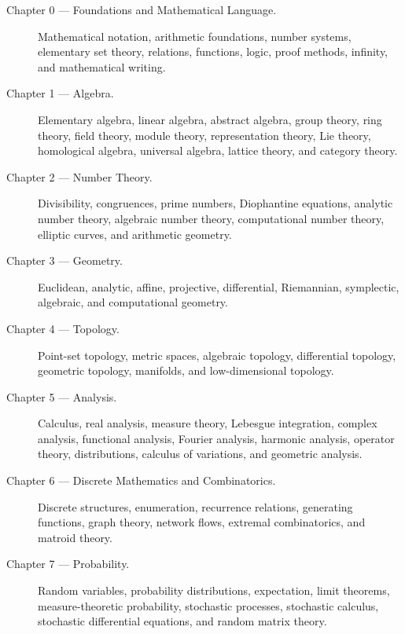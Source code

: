 \begin{description}

    \item[Chapter 0 --- Foundations and Mathematical Language.]
    Mathematical notation, arithmetic foundations, number systems,
    elementary set theory, relations, functions, logic, proof methods,
    infinity, and mathematical writing.

    \item[Chapter 1 --- Algebra.]
    Elementary algebra, linear algebra, abstract algebra, group theory,
    ring theory, field theory, module theory, representation theory,
    Lie theory, homological algebra, universal algebra, lattice theory,
    and category theory.

    \item[Chapter 2 --- Number Theory.]
    Divisibility, congruences, prime numbers, Diophantine equations,
    analytic number theory, algebraic number theory, computational number
    theory, elliptic curves, and arithmetic geometry.

    \item[Chapter 3 --- Geometry.]
    Euclidean, analytic, affine, projective, differential, Riemannian,
    symplectic, algebraic, and computational geometry.

    \item[Chapter 4 --- Topology.]
    Point-set topology, metric spaces, algebraic topology,
    differential topology, geometric topology, manifolds, and
    low-dimensional topology.

    \item[Chapter 5 --- Analysis.]
    Calculus, real analysis, measure theory, Lebesgue integration,
    complex analysis, functional analysis, Fourier analysis,
    harmonic analysis, operator theory, distributions,
    calculus of variations, and geometric analysis.

    \item[Chapter 6 --- Discrete Mathematics and Combinatorics.]
    Discrete structures, enumeration, recurrence relations,
    generating functions, graph theory, network flows, extremal
    combinatorics, and matroid theory.

    \item[Chapter 7 --- Probability.]
    Random variables, probability distributions, expectation,
    limit theorems, measure-theoretic probability, stochastic processes,
    stochastic calculus, stochastic differential equations,
    and random matrix theory.


\end{description}
